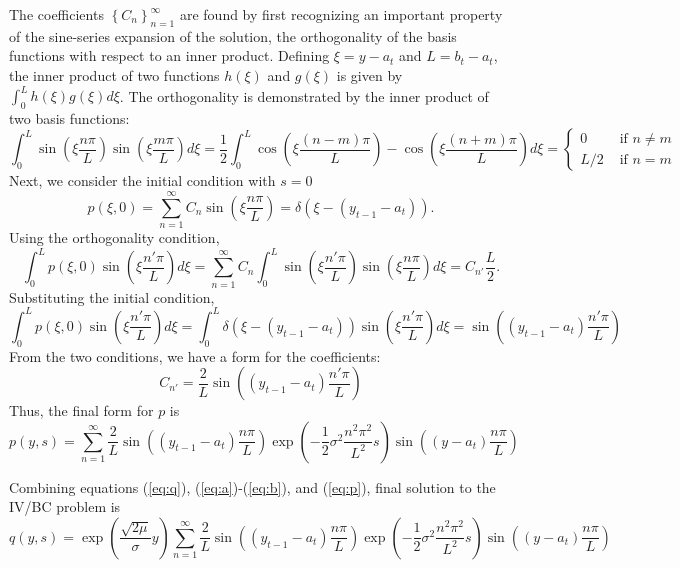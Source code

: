 The coefficients $\left\{ C_n \right\}_{n=1}^\infty$ are found by first recognizing an important property of the sine-series expansion of the solution, the orthogonality of the basis functions with respect to an inner product. Defining $\xi = y - a_t$ and $L = b_t - a_t$, the inner product of two functions $h(\xi)$ and $g(\xi)$ is given by $\int_{0}^L h(\xi)g(\xi) d\xi$. The orthogonality is demonstrated by the inner product of two basis functions:
\[
	\int_0^L \sin\left( \xi \frac{n\pi}{L} \right) \sin\left( \xi \frac{m\pi}{L} \right) d\xi =\frac{1}{2} \int_0^L \cos\left( \xi \frac{(n-m)\pi}{L} \right) - \cos\left( \xi \frac{(n+m)\pi}{L} \right) d\xi = \left\{ \begin{array}{cc}
														0 & \mbox{ if } n \neq m \\
														L/2 & \mbox{ if } n = m
													\end{array}
													\right.
\]
Next, we consider the initial condition with $s=0$
\[ p(\xi,0) = \sum_{n=1}^\infty C_n \sin\left( \xi \frac{n\pi}{L} \right) = \delta(\xi - (y_{t-1}-a_t) ). \]
Using the orthogonality condition,
\[
	 \int_0^L p(\xi,0) \sin\left( \xi \frac{n' \pi}{L} \right) d\xi = \sum_{n=1}^\infty C_n \int_0^L \sin\left( \xi \frac{n' \pi}{L} \right) \sin\left( \xi \frac{n \pi}{L} \right) d\xi  = C_{n'} \frac{L}{2}.
\]
Substituting the initial condition,
\[
	\int_0^L p(\xi,0) \sin\left( \xi \frac{n' \pi}{L} \right) d\xi = \int_0^L \delta(\xi - (y_{t-1} - a_t)) \sin\left( \xi \frac{n' \pi}{L} \right) d\xi = \sin\left( (y_{t-1} - a_t) \frac{n' \pi}{L} \right)
\]
From the two conditions, we have a form for the coefficients:
\begin{equation}
	C_{n'} = \frac{2}{L} \sin\left( (y_{t-1} - a_t) \frac{n' \pi}{L} \right)
\end{equation}
Thus, the final form for $p$ is 
\begin{equation}
	p(y,s) = \sum_{n=1}^\infty \frac{2}{L} \sin\left( (y_{t-1} - a_t) \frac{n \pi}{L} \right) \exp\left( -\frac{1}{2}\sigma^2 \frac{n^2 \pi^2}{L^2} s \right) \sin\left( (y-a_t) \frac{n\pi}{L} \right) \label{eq:p}
\end{equation}

Combining equations (\ref{eq:q}), (\ref{eq:a})-(\ref{eq:b}), and (\ref{eq:p}), final solution to the IV/BC problem is
\begin{equation}
	q(y,s) = \exp\left( \frac{\sqrt{2\mu}}{\sigma} y \right) \sum_{n=1}^\infty \frac{2}{L} \sin\left( (y_{t-1} - a_t) \frac{n \pi}{L} \right) \exp\left( -\frac{1}{2}\sigma^2 \frac{n^2 \pi^2}{L^2} s \right) \sin\left( (y-a_t) \frac{n\pi}{L} \right) \label{eq:q-final}
\end{equation}

